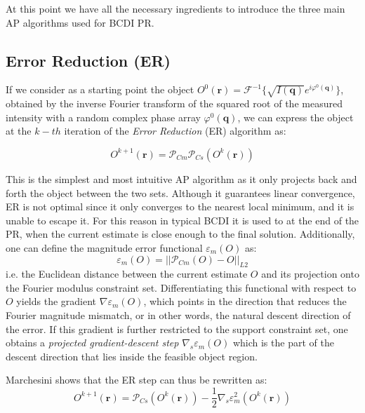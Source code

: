 At this point we have all the necessary ingredients to introduce the three main AP algorithms used for BCDI PR. 

\subsection{Error Reduction (ER)}

If we consider as a starting point the object $O^0(\mathbf{r}) = \mathcal{F}^{-1}\{ \sqrt{I(\mathbf{q})}e^{i\varphi^0(\mathbf{q})}\}$, obtained by 
the inverse Fourier transform of the squared root of the measured intensity with a random complex phase array $\varphi^0(\mathbf{q})$, 
we can express the object at the $k-th$ iteration of the \textit{Error Reduction} (ER) algorithm as: 

\begin{equation}
    O^{k+1}(\mathbf{r}) = \mathcal{P}_{Cm}\mathcal{P}_{Cs}(O^{k}(\mathbf{r}))
    \label{eq:ER}
\end{equation}

This is the simplest and most intuitive AP algorithm as it only projects back and forth the object between the two sets. 
Although it guarantees linear convergence, ER is not optimal since it only converges to the nearest local minimum, and it is unable 
to escape it. For this reason in typical BCDI it is used to at the end of the PR, when the current estimate is close enough 
to the final solution.
Additionally, one can define the magnitude error functional $\varepsilon_m(O)$ as: 
\begin{equation}
    \varepsilon_m(O) = || \mathcal{P}_{Cm}(O)  - O ||_{L2} 
    \label{eq:error_magnitude}
\end{equation}
i.e. the Euclidean distance between the current estimate $O$ and its projection onto the Fourier modulus constraint set. 
Differentiating this functional with respect to $O$ yields the gradient $\nabla \varepsilon_m(O)$, which points in the 
direction that reduces the Fourier magnitude mismatch, or in other words, the natural descent direction of the error.
If this gradient is further restricted to the support constraint set, one obtains a 
\textit{projected gradient-descent step} $\nabla_s \varepsilon_m(O)$ which is the part of the descent direction that 
lies inside the feasible object region.

Marchesini shows that the ER step can thus be rewritten as:
\begin{equation}
    O^{k+1}(\mathbf{r}) = \mathcal{P}_{Cs}(O^{k}(\mathbf{r})) - \frac{1}{2}\nabla_s \varepsilon^{2}_m(O^{k}(\mathbf{r}))
    \label{eq:ER_gradient}
\end{equation}

